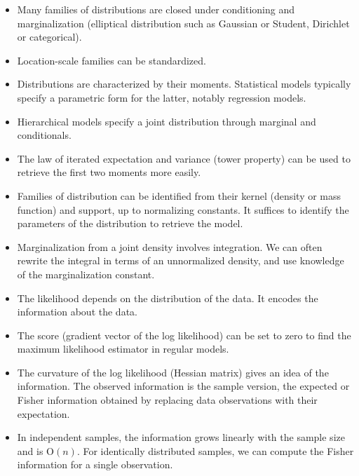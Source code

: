\documentclass[
  11pt,
  letterpaper,
]{scrbook}
\providecommand{\tightlist}{%
  \setlength{\itemsep}{0pt}\setlength{\parskip}{0pt}}
\theoremstyle{definition}
\theoremstyle{plain}
\theoremstyle{plain}
\theoremstyle{plain}
\theoremstyle{definition}
\theoremstyle{definition}
\theoremstyle{plain}
\theoremstyle{plain}
\theoremstyle{remark}
\begin{document}
\begin{tcolorbox}[enhanced jigsaw, arc=.35mm, bottomrule=.15mm, bottomtitle=1mm, breakable, colback=white, colbacktitle=quarto-callout-important-color!10!white, colframe=quarto-callout-important-color-frame, coltitle=black, left=2mm, leftrule=.75mm, opacityback=0, opacitybacktitle=0.6, rightrule=.15mm, title=\textcolor{quarto-callout-important-color}{\faExclamation}\hspace{0.5em}{\textbf{Summary}}, titlerule=0mm, toprule=.15mm, toptitle=1mm]

\begin{itemize}
\tightlist
\item
  Many families of distributions are closed under conditioning and
  marginalization (elliptical distribution such as Gaussian or Student,
  Dirichlet or categorical).
\item
  Location-scale families can be standardized.
\item
  Distributions are characterized by their moments. Statistical models
  typically specify a parametric form for the latter, notably regression
  models.
\item
  Hierarchical models specify a joint distribution through marginal and
  conditionals.
\item
  The law of iterated expectation and variance (tower property) can be
  used to retrieve the first two moments more easily.
\item
  Families of distribution can be identified from their kernel (density
  or mass function) and support, up to normalizing constants. It
  suffices to identify the parameters of the distribution to retrieve
  the model.
\item
  Marginalization from a joint density involves integration. We can
  often rewrite the integral in terms of an unnormalized density, and
  use knowledge of the marginalization constant.
\item
  The likelihood depends on the distribution of the data. It encodes the
  information about the data.
\item
  The score (gradient vector of the log likelihood) can be set to zero
  to find the maximum likelihood estimator in regular models.
\item
  The curvature of the log likelihood (Hessian matrix) gives an idea of
  the information. The observed information is the sample version, the
  expected or Fisher information obtained by replacing data observations
  with their expectation.
\item
  In independent samples, the information grows linearly with the sample
  size and is \(\mathrm{O}(n).\) For identically distributed samples, we
  can compute the Fisher information for a single observation.
\end{itemize}

\end{tcolorbox}
\end{document}
